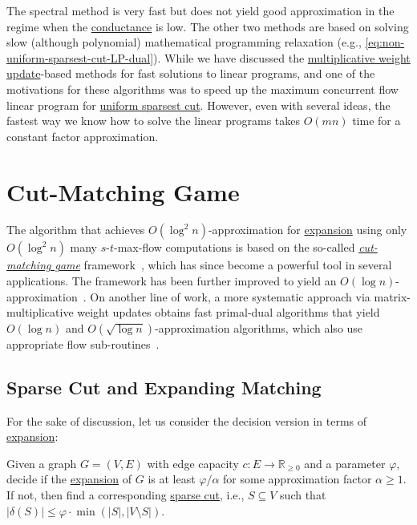 The spectral method is very fast but does not yield good approximation in the regime when the \hyperref[def:conductance]{conductance} is low. The other two methods are based on solving slow (although polynomial) mathematical programming relaxation (e.g., \autoref{eq:non-uniform-sparsest-cut-LP-dual}). While we have discussed the \hyperref[algo:MWU-discrete-non-uniform]{multiplicative weight update}-based methods for fast solutions to linear programs, and one of the motivations for these algorithms was to speed up the maximum concurrent flow linear program for \hyperref[prb:sparsest-cut]{uniform sparsest cut}. However, even with several ideas, the fastest way we know how to solve the linear programs takes \(O(mn)\) time for a constant factor approximation.

\section{Cut-Matching Game}
The algorithm that achieves \(O(\log ^2 n)\)-approximation for \hyperref[def:expansion]{expansion} using only \(O(\log ^2 n)\) many \(s\)-\(t\)-max-flow computations is based on the so-called \hyperref[def:cut-matching-game]{\emph{cut-matching game}} framework~\cite{khandekar2009graph}, which has since become a powerful tool in several applications. The framework has been further improved to yield an \(O(\log n)\)-approximation~\cite{orecchia2008partitioning}. On another line of work, a more systematic approach via matrix-multiplicative weight updates obtains fast primal-dual algorithms that yield \(O(\log n)\) and \(O(\sqrt{\log n} )\)-approximation algorithms, which also use appropriate flow sub-routines~\cite{arora2007combinatorial}.

\subsection{Sparse Cut and Expanding Matching}
For the sake of discussion, let us consider the decision version in terms of \hyperref[def:expansion]{expansion}:

\begin{problem}[Expansion]\label{prb:expansion}
Given a graph \(G = (V, E)\) with edge capacity \(c\colon E \to \mathbb{R} _{\geq 0}\) and a parameter \(\varphi \), decide if the \hyperref[def:expansion]{expansion} of \(G\) is at least \(\varphi / \alpha \) for some approximation factor \(\alpha \geq 1\). If not, then find a corresponding \hyperref[prb:sparsest-cut]{sparse cut}, i.e., \(S \subseteq V\) such that \(\lvert \delta (S) \rvert \leq \varphi \cdot \min (\lvert S \rvert , \lvert V \setminus S \rvert )\).
\end{problem}

